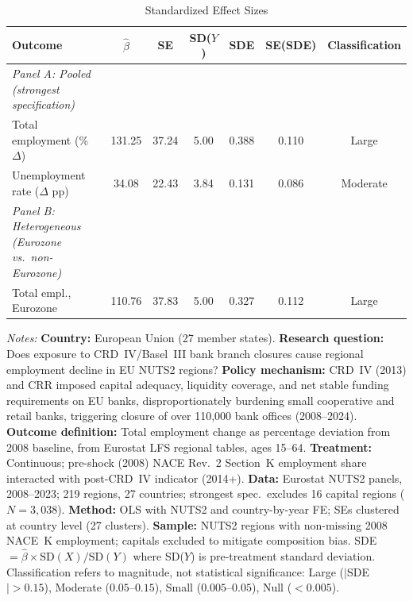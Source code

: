 \begin{table}[t]
\centering
\caption{Standardized Effect Sizes}
\label{tab:sde}
\scriptsize\begin{tabular}{lcccccc}
\toprule
Outcome & $\hat{\beta}$ & SE & SD($Y$) & SDE & SE(SDE) & Classification \\
\midrule
\emph{Panel A: Pooled (strongest specification)} \\
\addlinespace
Total employment (\% $\Delta$) & 131.25 & 37.24 & 5.00 & 0.388 & 0.110 & Large \\
Unemployment rate ($\Delta$ pp) & 34.08 & 22.43 & 3.84 & 0.131 & 0.086 & Moderate \\
\addlinespace
\emph{Panel B: Heterogeneous (Eurozone vs.~non-Eurozone)} \\
\addlinespace
Total empl., Eurozone & 110.76 & 37.83 & 5.00 & 0.327 & 0.112 & Large \\
\bottomrule
\end{tabular}
\par\vspace{0.3em}
{\scriptsize \textit{Notes:}
\textbf{Country:} European Union (27 member states).
\textbf{Research question:} Does exposure to CRD~IV/Basel~III bank branch closures cause regional employment decline in EU NUTS2 regions?
\textbf{Policy mechanism:} CRD~IV (2013) and CRR imposed capital adequacy, liquidity coverage, and net stable funding requirements on EU banks, disproportionately burdening small cooperative and retail banks, triggering closure of over 110,000 bank offices (2008--2024).
\textbf{Outcome definition:} Total employment change as percentage deviation from 2008 baseline, from Eurostat LFS regional tables, ages 15--64.
\textbf{Treatment:} Continuous; pre-shock (2008) NACE Rev.~2 Section~K employment share interacted with post-CRD~IV indicator (2014+).
\textbf{Data:} Eurostat NUTS2 panels, 2008--2023; 219 regions, 27 countries; strongest spec.\ excludes 16 capital regions ($N = 3{,}038$).
\textbf{Method:} OLS with NUTS2 and country-by-year FE; SEs clustered at country level (27 clusters).
\textbf{Sample:} NUTS2 regions with non-missing 2008 NACE~K employment; capitals excluded to mitigate composition bias.
SDE $= \hat{\beta} \times \text{SD}(X) / \text{SD}(Y)$ where SD($Y$) is pre-treatment standard deviation.
Classification refers to magnitude, not statistical significance: Large ($|$SDE$| > 0.15$), Moderate ($0.05$--$0.15$), Small ($0.005$--$0.05$), Null ($< 0.005$).}
\end{table}
